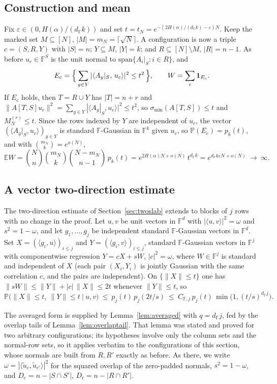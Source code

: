 \documentclass[11pt,reqno]{amsart}
\theoremstyle{plain}
\theoremstyle{definition}
\theoremstyle{remark}
\newcommand{\F}{\mathbb{F}}
\newcommand{\PP}{\mathbb{P}}
\newcommand{\EE}{\mathbb{E}}
\newcommand{\one}{\mathbf{1}}
\newcommand{\smin}{\sigma_{\min}}
\newcommand{\dF}{d_{\F}}
\begin{document}
\subsection{Construction and mean}
Fix $\varepsilon\in(0,H(\alpha)/(\dF k))$ and set $t=t_N=e^{-(2H(\alpha)/(\dF k)-\varepsilon)N}$.
Keep the marked set $M\subseteq[N]$, $|M|=m_N=\lceil\sqrt N\rceil$. A configuration is now a triple
$c=(S,R,Y)$ with $|S|=n$; $Y\subseteq M$, $|Y|=k$; and $R\subseteq[N]\setminus M$, $|R|=n-1$. As
before $u_c\in\F^S$ is the unit normal to $\mathrm{span}\{A_i|_S:i\in R\}$, and
\[
  E_c=\Bigl\{\,\sum_{y\in Y}|\langle A_y|_S,\,u_c\rangle|^2\le t^2\,\Bigr\},\qquad
  W=\sum_c\one_{E_c}.
\]
If $E_c$ holds, then $T=R\cup Y$ has $|T|=n+r$ and $\|A[T,S]u_c\|^2=\sum_{y\in Y}|\langle
A_y|_S,u_c\rangle|^2\le t^2$, so $\smin(A[T,S])\le t$ and $M_N^{(r)}\le t$. Since the rows indexed
by $Y$ are independent of $u_c$, the vector $(\langle A_y|_S,u_c\rangle)_{y\in Y}$ is standard
$\F$-Gaussian in $\F^k$ given $u_c$, so $\PP(E_c)=p_k(t)$, and with
$\binom{m_N}k=e^{o(N)}$,
\[
  \EE W=\binom Nn\binom{m_N}k\binom{N-m_N}{n-1}\,p_k(t)
  =e^{2H(\alpha)N+o(N)}\,t^{\dF k}=e^{\dF k\varepsilon N+o(N)}\ \to\ \infty .
\]

\subsection{A vector two-direction estimate}
The two-direction estimate of Section~\ref{sec:twoslab} extends to blocks of $j$ rows with no change
in the proof. Let $u,v$ be unit vectors in $\F^d$ with $|\langle u,v\rangle|^2=\omega$ and
$s^2=1-\omega$, and let $g_1,\dots,g_j$ be independent standard $\F$-Gaussian vectors in $\F^d$.
Set $X=(\langle g_i,u\rangle)_{i\le j}$ and $Y=(\langle g_i,v\rangle)_{i\le j}$, standard
$\F$-Gaussian vectors in $\F^j$ with componentwise regression $Y=cX+sW$, $|c|^2=\omega$, where
$W\in\F^j$ is standard and independent of $X$ (each pair $(X_i,Y_i)$ is jointly Gaussian with the
same correlation $c$, and the pairs are independent). On $\{\|X\|\le t\}$ one has $\|sW\|\le\|Y\|+
|c|\,\|X\|\le2t$ whenever $\|Y\|\le t$, so
\begin{equation}\label{eq:vectorslab}
  \PP\bigl(\|X\|\le t,\ \|Y\|\le t\ \big|\ u,v\bigr)\ \le\ p_j(t)\,p_j(2t/s)
  \ \le\ C_{\F,j}\,p_j(t)\,\min\!\bigl(1,(t/s)^{\dF j}\bigr).
\end{equation}

The averaged form is supplied by Lemma~\ref{lem:averaged} with $q=\dF j$, fed by the overlap tails
of Lemma~\ref{lem:overlaptail}. That lemma was stated and proved for two arbitrary configurations;
its hypotheses involve only the column sets and the normal-row sets, so it applies verbatim to the
configurations of this section, whose normals are built from $R,R'$ exactly as before. As there, we
write $\omega=|\langle\tilde u_c,\tilde u_{c'}\rangle|^2$ for the squared overlap of the zero-padded
normals, $s^2=1-\omega$, and $D_{\mathrm c}=n-|S\cap S'|$, $D_{\mathrm r}=n-|R\cap R'|$.
\end{document}
